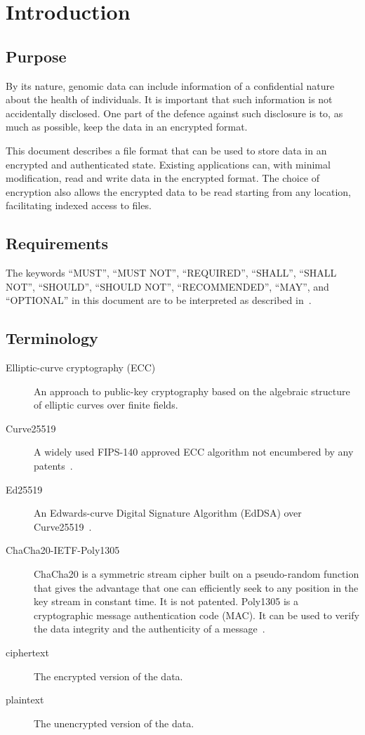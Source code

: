\section{Introduction}
\subsection{Purpose}
By its nature, genomic data can include information of a confidential
nature about the health of individuals.
%
It is important that such information is not accidentally disclosed.
%
One part of the defence against such disclosure is to, as much as
possible, keep the data in an encrypted format.
%

This document describes a file format that can be used to store data
in an encrypted and authenticated state.
%
Existing applications can, with minimal modification, read and write
data in the encrypted format.
%
The choice of encryption also allows the encrypted data to be read
starting from any location, facilitating indexed access to files.

\subsection{Requirements}
The keywords ``MUST'', ``MUST NOT'', ``REQUIRED'', ``SHALL'', ``SHALL
NOT'', ``SHOULD'', ``SHOULD NOT'', ``RECOMMENDED'', ``MAY'', and
``OPTIONAL'' in this document are to be interpreted as described
in~\cite{RFC2119}.

\subsection{Terminology}
%
\begin{description}
\item[Elliptic-curve cryptography (ECC)] %
  An approach to public-key cryptography based on the algebraic
  structure of elliptic curves over finite fields.
\item[Curve25519] %
  A widely used FIPS-140 approved ECC algorithm not encumbered by any
  patents~\cite{RFC7748}.
\item[Ed25519] %
  An Edwards-curve Digital Signature Algorithm (EdDSA) over
  Curve25519~\cite{RFC8032}.
\item[ChaCha20-IETF-Poly1305] %
  ChaCha20 is a symmetric stream cipher built on a pseudo-random
  function that gives the advantage that one can efficiently seek to
  any position in the key stream in constant time.
  It is not patented.
  Poly1305 is a cryptographic message authentication code (MAC).
  It can be used to verify the data integrity and the authenticity of
  a message~\cite{RFC8439}.
\item[ciphertext] %
  The encrypted version of the data.
\item[plaintext] %
  The unencrypted version of the data.
\end{description}
